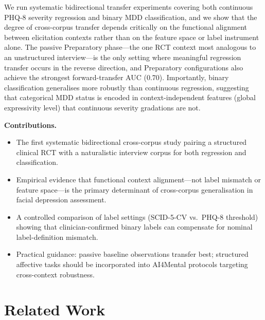 \documentclass[sigconf]{acmart}
\begin{document}
We run systematic bidirectional transfer experiments covering both continuous
PHQ-8 severity regression and binary MDD classification, and we show that
the degree of cross-corpus transfer depends critically on the functional alignment
between elicitation contexts rather than on the feature space or label instrument
alone. The passive Preparatory phase---the one RCT context most analogous to an
unstructured interview---is the only setting where meaningful regression transfer
occurs in the reverse direction, and Preparatory configurations also achieve the
strongest forward-transfer AUC (0.70). Importantly, binary classification
generalises more robustly than continuous regression, suggesting that categorical
MDD status is encoded in context-independent features (global expressivity level)
that continuous severity gradations are not.

\noindent\textbf{Contributions.}
\begin{itemize}[leftmargin=*,topsep=2pt,itemsep=1pt]
  \item The first systematic bidirectional cross-corpus study pairing a structured
        clinical RCT with a naturalistic interview corpus for both regression and
        classification.
  \item Empirical evidence that functional context alignment---not label mismatch or
        feature space---is the primary determinant of cross-corpus generalisation in
        facial depression assessment.
  \item A controlled comparison of label settings (SCID-5-CV vs.\ PHQ-8 threshold)
        showing that clinician-confirmed binary labels can compensate for nominal
        label-definition mismatch.
  \item Practical guidance: passive baseline observations transfer best; structured
        affective tasks should be incorporated into AI4Mental protocols targeting
        cross-context robustness.
\end{itemize}


\section{Related Work}
\label{sec:related}
\end{document}
